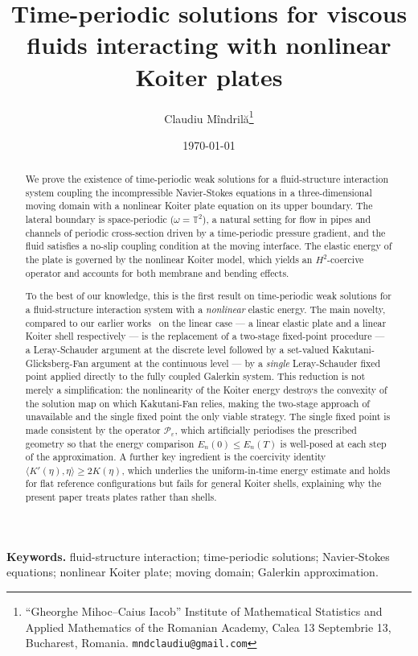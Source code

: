 \documentclass[10pt,a4paper]{article}
\title{Time-periodic solutions for viscous fluids interacting with nonlinear Koiter plates}
\author{Claudiu M\^{i}ndril\u{a}\thanks{``Gheorghe Mihoc--Caius Iacob'' Institute of Mathematical Statistics and Applied Mathematics of the Romanian Academy, Calea 13 Septembrie 13, Bucharest, Romania. \texttt{mndclaudiu@gmail.com}}}
\date{\today}
\numberwithin{equation}{section}
\begin{document}
\maketitle

\begin{abstract}
We prove the existence of time-periodic weak solutions for a fluid-structure interaction
system coupling the incompressible Navier-Stokes equations in a three-dimensional moving
domain with a nonlinear Koiter plate equation on its upper boundary. The lateral boundary
is space-periodic ($\omega = \mathbb{T}^{2}$), a natural setting for flow in pipes and
channels of periodic cross-section driven by a time-periodic pressure gradient, and the
fluid satisfies a no-slip coupling condition at the moving interface. The elastic energy
of the plate is governed by the nonlinear Koiter model, which yields an $H^2$-coercive
operator and accounts for both membrane and bending effects.

To the best of our knowledge, this is the first result on time-periodic weak solutions
for a fluid-structure interaction system with a \emph{nonlinear} elastic energy.
The main novelty, compared to our earlier works~\cite{Claudiu22, mindrila-schwarz-shell}
on the linear case — a linear elastic plate and a linear Koiter shell respectively —
is the replacement of a two-stage fixed-point procedure — a Leray-Schauder argument
at the discrete level followed by a set-valued Kakutani-Glicksberg-Fan argument at
the continuous level — by a \emph{single} Leray-Schauder fixed point applied directly
to the fully coupled Galerkin system. This reduction is not merely a simplification:
the nonlinearity of the Koiter energy destroys the convexity of the solution map on
which Kakutani-Fan relies, making the two-stage approach of~\cite{Claudiu22}
unavailable and the single fixed point the only viable strategy.
The single fixed point is made consistent by the operator $\mathcal{P}_\varepsilon$,
which artificially periodises the prescribed geometry so that the energy comparison
$E_n(0) \leq E_n(T)$ is well-posed at each step of the approximation.
A further key ingredient is the coercivity identity
$\langle K'(\eta), \eta \rangle \ge 2K(\eta)$,
which underlies the uniform-in-time energy estimate and holds for flat reference
configurations but fails for general Koiter shells, explaining why the present paper
treats plates rather than shells.
\end{abstract}

\medskip
\noindent\textbf{Keywords.} fluid-structure interaction; time-periodic solutions; Navier-Stokes equations; nonlinear Koiter plate; moving domain; Galerkin approximation.
\end{document}
